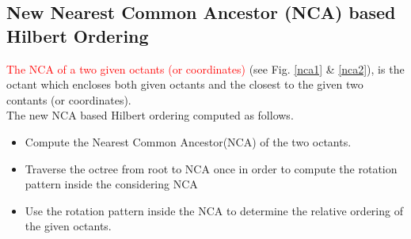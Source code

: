 \documentclass[a0,landscape]{a0poster}
\begin{document}
\begin{multicols}{4}


\subsection*{New Nearest Common Ancestor (NCA) based Hilbert Ordering}


\textcolor{red}{The NCA of a two given octants (or coordinates)} (see Fig. \ref{nca1} \& \ref{nca2}), is the octant which encloses both given octants and the closest to the given two contants (or coordinates). \\
\color{orange}
The new NCA based Hilbert ordering computed as
follows. 
\begin{itemize}
 \item Compute the Nearest Common Ancestor(NCA) of the two octants.
 \item Traverse the octree from root to NCA once in order to compute the rotation pattern inside the considering NCA
 \item Use the rotation pattern inside the NCA to determine the relative ordering of the given octants.
\end{itemize}

\color{DarkSlateGray}

\end{multicols}
\end{document}
